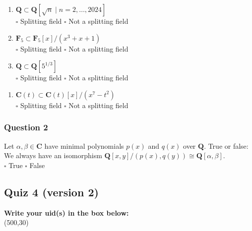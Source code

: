 \documentclass[11pt]{article}
\begin{document}
\begin{enumerate}
\item \(\mathbf{Q} \subset \mathbf{Q}[\sqrt n \mid n = 2, \dots, 2024]\)\\

\(\square\) Splitting field \qquad \(\square\)   Not a splitting field \\

\item \(\mathbf{F}_5 \subset \mathbf{F}_5[x]/(x^3+x+1)\)\\

\(\square\) Splitting field \qquad \(\square\)   Not a splitting field \\

\item \(\mathbf{Q} \subset \mathbf{Q}[5^{1/3}]\)\\

\(\square\) Splitting field \qquad \(\square\)   Not a splitting field \\
\end{enumerate}


\begin{enumerate}
\item \(\mathbf{C}(t) \subset \mathbf{C}(t)[x]/(x^7-t^2)\)\\

\(\square\) Splitting field \qquad \(\square\)   Not a splitting field \\
\end{enumerate}
\subsubsection{Question 2}
\label{sec:org73ffd49}

Let \(\alpha, \beta \in \mathbf{C}\) have minimal polynomials \(p(x)\) and \(q(x)\) over \(\mathbf{Q}\).
True or false: We always have an isomorphism \(\mathbf{Q}[x,y]/(p(x), q(y)) \cong \mathbf{Q}[\alpha,\beta]\).\\

\(\square\) True \qquad \(\square\)   False \\
\subsection{Quiz 4 (version 2)}
\label{sec:orgf7ba323}
\vspace{1cm}

\noindent
\textbf{Write your uid(s) in the box below:}\\
\framebox(500,30)
\end{document}
